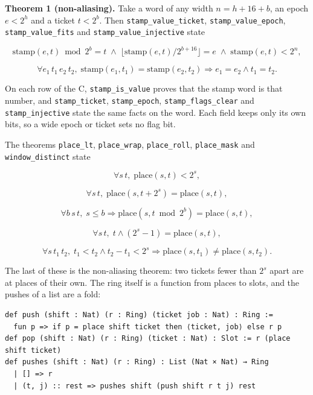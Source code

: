 \textbf{Theorem 1 (non-aliasing).} Take a word of any width \(n = h + 16 + b\), an epoch \(e < 2^{h}\) and a ticket \(t < 2^{b}\). Then \texttt{stamp\_\allowbreak{}value\_\allowbreak{}ticket}, \texttt{stamp\_\allowbreak{}value\_\allowbreak{}epoch}, \texttt{stamp\_\allowbreak{}value\_\allowbreak{}fits} and \texttt{stamp\_\allowbreak{}value\_\allowbreak{}injective} state

\[
\mathrm{stamp}(e, t) \bmod 2^{b} = t \;\land\; \lfloor \mathrm{stamp}(e, t) / 2^{b+16} \rfloor = e \;\land\; \mathrm{stamp}(e, t) < 2^{n},
\]

\[
\forall e_1\, t_1\, e_2\, t_2,\; \mathrm{stamp}(e_1, t_1) = \mathrm{stamp}(e_2, t_2) \Rightarrow e_1 = e_2 \land t_1 = t_2.
\]

On each row of the C, \texttt{stamp\_\allowbreak{}is\_\allowbreak{}value} proves that the stamp word is that number, and \texttt{stamp\_\allowbreak{}ticket}, \texttt{stamp\_\allowbreak{}epoch}, \texttt{stamp\_\allowbreak{}flags\_\allowbreak{}clear} and \texttt{stamp\_\allowbreak{}injective} state the same facts on the word. Each field keeps only its own bits, so a wide epoch or ticket sets no flag bit.

The theorems \texttt{place\_\allowbreak{}lt}, \texttt{place\_\allowbreak{}wrap}, \texttt{place\_\allowbreak{}roll}, \texttt{place\_\allowbreak{}mask} and \texttt{window\_\allowbreak{}distinct} state

\[
\forall s\, t,\; \mathrm{place}(s, t) < 2^{s},
\]

\[
\forall s\, t,\; \mathrm{place}(s, t + 2^{s}) = \mathrm{place}(s, t),
\]

\[
\forall b\, s\, t,\; s \le b \Rightarrow \mathrm{place}(s, t \bmod 2^{b}) = \mathrm{place}(s, t),
\]

\[
\forall s\, t,\; t \land (2^{s} - 1) = \mathrm{place}(s, t),
\]

\[
\forall s\, t_1\, t_2,\; t_1 < t_2 \land t_2 - t_1 < 2^{s} \Rightarrow \mathrm{place}(s, t_1) \neq \mathrm{place}(s, t_2).
\]

The last of these is the non-aliasing theorem: two tickets fewer than \(2^{s}\) apart are at places of their own. The ring itself is a function from places to slots, and the pushes of a list are a fold:

\begin{Verbatim}
def push (shift : Nat) (r : Ring) (ticket job : Nat) : Ring :=
  fun p => if p = place shift ticket then ⟨ticket, job⟩ else r p
def pop (shift : Nat) (r : Ring) (ticket : Nat) : Slot := r (place shift ticket)
def pushes (shift : Nat) (r : Ring) : List (Nat × Nat) → Ring
  | [] => r
  | (t, j) :: rest => pushes shift (push shift r t j) rest
\end{Verbatim}

